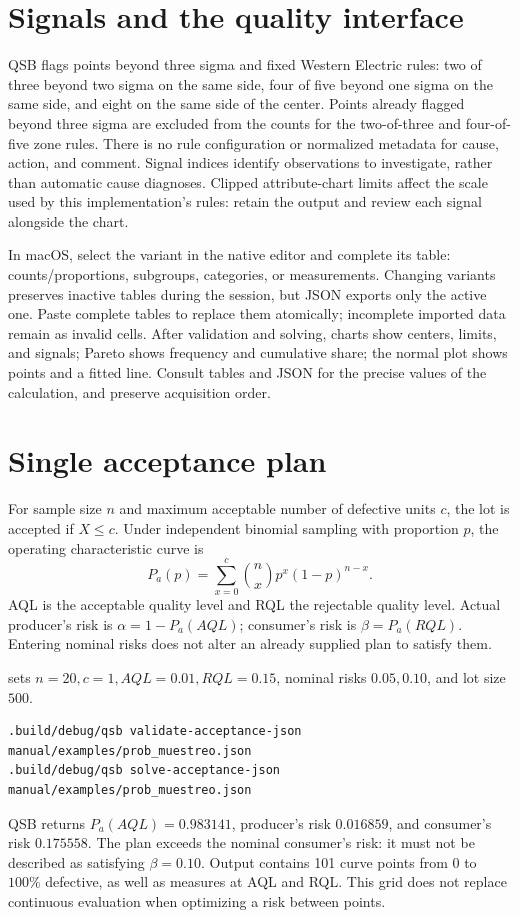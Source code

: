 \section{Signals and the quality interface}
QSB flags points beyond three sigma and fixed Western Electric rules: two of
three beyond two sigma on the same side, four of five beyond one sigma on the
same side, and eight on the same side of the center. Points already flagged
beyond three sigma are excluded from the counts for the two-of-three and
four-of-five zone rules. There is no rule configuration or normalized metadata
for cause, action, and comment. Signal indices identify observations to
investigate, rather than automatic cause diagnoses. Clipped attribute-chart
limits affect the scale used by this implementation's rules: retain the output
and review each signal alongside the chart.

In macOS, select the variant in the native editor and complete its table:
counts/proportions, subgroups, categories, or measurements. Changing variants
preserves inactive tables during the session, but JSON exports only the active
one. Paste complete tables to replace them atomically; incomplete imported
data remain as invalid cells. After validation and solving, charts show centers,
limits, and signals; Pareto shows frequency and cumulative share; the normal
plot shows points and a fitted line. Consult tables and JSON for the precise
values of the calculation, and preserve acquisition order.

\section{Single acceptance plan}
For sample size \(n\) and maximum acceptable number of defective units
\(c\), the lot is accepted if \(X\le c\). Under independent binomial
sampling with proportion \(p\), the operating characteristic curve is
\[
 P_a(p)=\sum_{x=0}^c{n\choose x}p^x(1-p)^{n-x}.
\]
AQL is the acceptable quality level and RQL the rejectable quality level.
Actual producer's risk is \(\alpha=1-P_a(AQL)\); consumer's risk is
\(\beta=P_a(RQL)\). Entering nominal risks does not alter an already
supplied plan to satisfy them.

 sets \(n=20,c=1,AQL=0.01,RQL=0.15\), nominal
risks \(0.05,0.10\), and lot size \(500\).
\begin{lstlisting}
.build/debug/qsb validate-acceptance-json manual/examples/prob_muestreo.json
.build/debug/qsb solve-acceptance-json manual/examples/prob_muestreo.json
\end{lstlisting}
QSB returns \(P_a(AQL)=0.983141\), producer's risk \(0.016859\), and
consumer's risk \(0.175558\). The plan exceeds the nominal consumer's risk:
it must not be described as satisfying \(\beta=0.10\). Output contains
101 curve points from \(0\) to \(100\%\) defective, as well as measures
at AQL and RQL. This grid does not replace continuous evaluation when optimizing
a risk between points.

